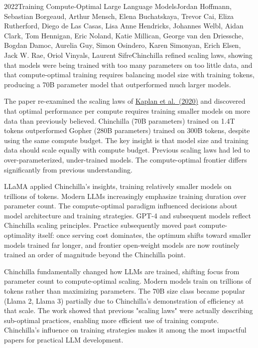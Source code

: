 
\begin{papersummary}{2022}{Training Compute-Optimal Large Language Models}{Jordan Hoffmann, Sebastian Borgeaud, Arthur Mensch, Elena Buchatskaya, Trevor Cai, Eliza Rutherford, Diego de Las Casas, Lisa Anne Hendricks, Johannes Welbl, Aidan Clark, Tom Hennigan, Eric Noland, Katie Millican, George van den Driessche, Bogdan Damoc, Aurelia Guy, Simon Osindero, Karen Simonyan, Erich Elsen, Jack W. Rae, Oriol Vinyals, Laurent Sifre}{Chinchilla refined scaling laws, showing that models were being trained with too many parameters on too little data, and that compute-optimal training requires balancing model size with training tokens, producing a 70B parameter model that outperformed much larger models.}

The paper re-examined the scaling laws of \hyperref[paper:kaplan-2020]{Kaplan et al.\ (2020)} and discovered that optimal performance per compute requires training smaller models on more data than previously believed. Chinchilla (70B parameters) trained on 1.4T tokens outperformed Gopher (280B parameters) trained on 300B tokens, despite using the same compute budget. The key insight is that model size and training data should scale equally with compute budget. Previous scaling laws had led to over-parameterized, under-trained models. The compute-optimal frontier differs significantly from previous understanding.

LLaMA applied Chinchilla's insights, training relatively smaller models on trillions of tokens. Modern LLMs increasingly emphasize training duration over parameter count. The compute-optimal paradigm influenced decisions about model architecture and training strategies. GPT-4 and subsequent models reflect Chinchilla scaling principles. Practice subsequently moved past compute-optimality itself: once serving cost dominates, the optimum shifts toward smaller models trained far longer, and frontier open-weight models are now routinely trained an order of magnitude beyond the Chinchilla point.

Chinchilla fundamentally changed how LLMs are trained, shifting focus from parameter count to compute-optimal scaling. Modern models train on trillions of tokens rather than maximizing parameters. The 70B size class became popular (Llama 2, Llama 3) partially due to Chinchilla's demonstration of efficiency at that scale. The work showed that previous "scaling laws" were actually describing sub-optimal practices, enabling more efficient use of training compute. Chinchilla's influence on training strategies makes it among the most impactful papers for practical LLM development.

\end{papersummary}
